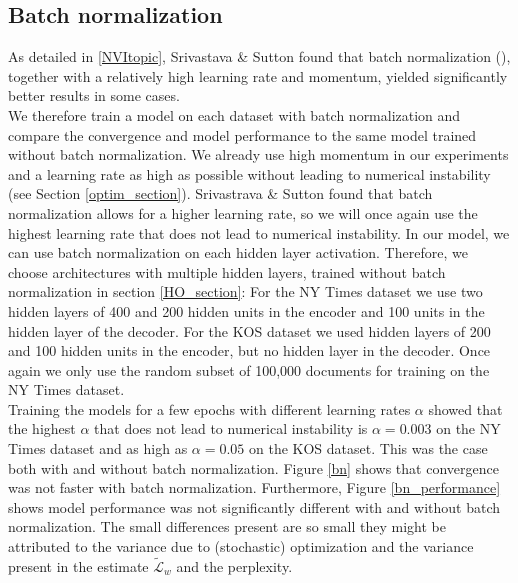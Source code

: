 \documentclass{report}
\begin{document}
	\subsection{Batch normalization}\label{batch_norm}
	As detailed in \ref{NVItopic}, Srivastava \& Sutton \cite{srivastava2017neural} found that  batch normalization (\cite{srivastava2017neural}), together with a relatively high learning rate and momentum, yielded significantly better results in some cases. \\
	We therefore train a model on each dataset with batch normalization and compare the convergence and model performance to the same model trained without batch normalization. We already use high momentum in our experiments and a learning rate as high as possible without leading to numerical instability (see Section \ref{optim_section}). Srivastrava \& Sutton \cite{srivastava2017neural} found that batch normalization allows for a higher learning rate, so we will once again use the highest learning rate that does not lead to numerical instability.	In our model, we can use batch normalization on each hidden layer activation. Therefore, we choose architectures with multiple hidden layers, trained without batch normalization in section \ref{HO_section}: For the NY Times dataset we use two hidden layers of  400 and 200 hidden units in the encoder and 100 units in the hidden layer of the decoder. For the KOS dataset we used hidden layers of 200 and 100 hidden units in the encoder, but no hidden layer in the decoder.
	Once again we only use the random subset of 100,000 documents for training on the NY Times dataset. \\
	Training the models for a few epochs with different learning rates $\alpha$ showed that the highest $\alpha$ that does not lead to numerical instability is $\alpha = 0.003$ on the NY Times dataset and as high as $\alpha = 0.05$ on the KOS dataset. This was the case both with and without batch normalization. Figure \ref{bn} shows that convergence was not faster with batch normalization. Furthermore, Figure \ref{bn_performance} shows model performance was not significantly different with and without batch normalization. The small differences present are so small they might be attributed to the variance due to (stochastic) optimization and the variance present in the estimate $\tilde{\mathcal{L}}_w$ and the perplexity.
		
\end{document}
